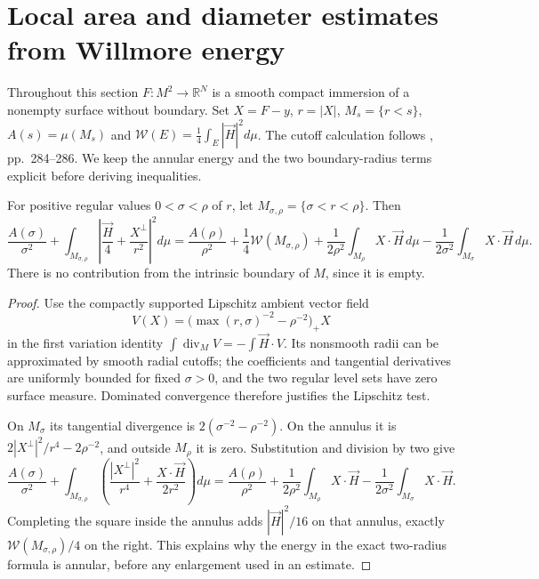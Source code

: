\chapter{Local area and diameter estimates from Willmore energy}\label{sec:willmore-local-area-estimates}
Throughout this section $F:M^2\to\mathbb R^N$ is a smooth compact immersion of a nonempty surface without boundary. Set $X=F-y$, $r=|X|$, $M_s=\{r<s\}$, $A(s)=\mu(M_s)$ and $\mathcal W(E)=\frac14\int_E|\vec H|^2d\mu$. The cutoff calculation follows \cite{SimW93}, pp.~284--286. We keep the annular energy and the two boundary-radius terms explicit before deriving inequalities.

\begin{proposition}\label{prop:willmore-two-radius-identity}
For positive regular values $0<\sigma<\rho$ of $r$, let $M_{\sigma,\rho}=\{\sigma<r<\rho\}$. Then
\[
 \frac{A(\sigma)}{\sigma^2}
 +\int_{M_{\sigma,\rho}}\left|\frac{\vec H}4+\frac{X^\perp}{r^2}\right|^2d\mu
 =\frac{A(\rho)}{\rho^2}+\frac14\mathcal W(M_{\sigma,\rho})
 +\frac1{2\rho^2}\int_{M_\rho}X\cdot\vec H\,d\mu
 -\frac1{2\sigma^2}\int_{M_\sigma}X\cdot\vec H\,d\mu.
\]
There is no contribution from the intrinsic boundary of $M$, since it is empty.
\end{proposition}
\begin{proof}
Use the compactly supported Lipschitz ambient vector field
\[
 V(X)=\bigl(\max(r,\sigma)^{-2}-\rho^{-2}\bigr)_+X
\]
in the first variation identity $\int\operatorname{div}_MV=-\int\vec H\cdot V$. Its nonsmooth radii can be approximated by smooth radial cutoffs; the coefficients and tangential derivatives are uniformly bounded for fixed $\sigma>0$, and the two regular level sets have zero surface measure. Dominated convergence therefore justifies the Lipschitz test.

On $M_\sigma$ its tangential divergence is $2(\sigma^{-2}-\rho^{-2})$. On the annulus it is $2|X^\perp|^2/r^4-2\rho^{-2}$, and outside $M_\rho$ it is zero. Substitution and division by two give
\[
 \frac{A(\sigma)}{\sigma^2}+\int_{M_{\sigma,\rho}}
 \left(\frac{|X^\perp|^2}{r^4}+\frac{X\cdot\vec H}{2r^2}\right)d\mu
 =\frac{A(\rho)}{\rho^2}+\frac1{2\rho^2}\int_{M_\rho}X\cdot\vec H
 -\frac1{2\sigma^2}\int_{M_\sigma}X\cdot\vec H.
\]
Completing the square inside the annulus adds $|\vec H|^2/16$ on that annulus, exactly $\mathcal W(M_{\sigma,\rho})/4$ on the right. This explains why the energy in the exact two-radius formula is annular, before any enlargement used in an estimate.
\end{proof}

